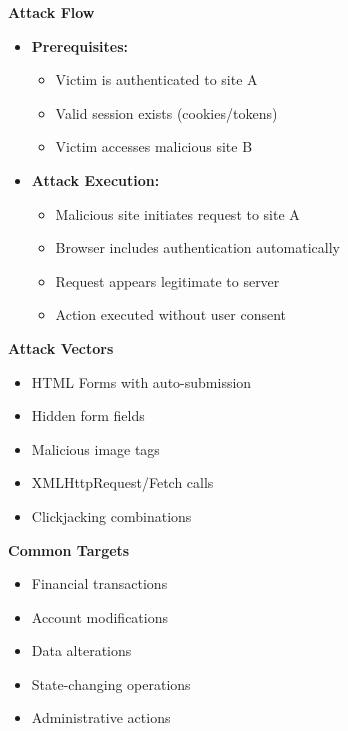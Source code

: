 \textbf{Attack Flow}
\begin{itemize}
    \item \textbf{Prerequisites:}
        \begin{itemize}
            \item Victim is authenticated to site A
            \item Valid session exists (cookies/tokens)
            \item Victim accesses malicious site B
        \end{itemize}
    
    \item \textbf{Attack Execution:}
        \begin{itemize}
            \item Malicious site initiates request to site A
            \item Browser includes authentication automatically
            \item Request appears legitimate to server
            \item Action executed without user consent
        \end{itemize}
\end{itemize}

\textbf{Attack Vectors}
\begin{itemize}
    \item HTML Forms with auto-submission
    \item Hidden form fields
    \item Malicious image tags
    \item XMLHttpRequest/Fetch calls
    \item Clickjacking combinations
\end{itemize}

\textbf{Common Targets}
\begin{itemize}
    \item Financial transactions
    \item Account modifications
    \item Data alterations
    \item State-changing operations
    \item Administrative actions
\end{itemize}

